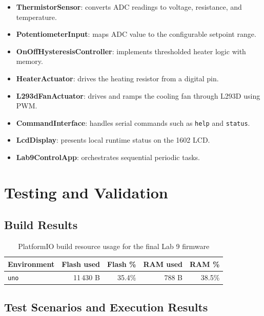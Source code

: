 \documentclass[12pt]{article}
\begin{document}
\begin{itemize}
    \item \textbf{ThermistorSensor}: converts ADC readings to voltage, resistance, and temperature.
    \item \textbf{PotentiometerInput}: maps ADC value to the configurable setpoint range.
    \item \textbf{OnOffHysteresisController}: implements thresholded heater logic with memory.
    \item \textbf{HeaterActuator}: drives the heating resistor from a digital pin.
    \item \textbf{L293dFanActuator}: drives and ramps the cooling fan through L293D using PWM.
    \item \textbf{CommandInterface}: handles serial commands such as \texttt{help} and \texttt{status}.
    \item \textbf{LcdDisplay}: presents local runtime status on the 1602 LCD.
    \item \textbf{Lab9ControlApp}: orchestrates sequential periodic tasks.
\end{itemize}

\section{Testing and Validation}

\subsection{Build Results}

\begin{table}[H]
\centering
\begin{tabular}{lrrrr}
\toprule
\textbf{Environment} & \textbf{Flash used} & \textbf{Flash \%} & \textbf{RAM used} & \textbf{RAM \%} \\
\midrule
\texttt{uno} & 11\,430 B & 35.4\% & 788 B & 38.5\% \\
\bottomrule
\end{tabular}
\caption{PlatformIO build resource usage for the final Lab 9 firmware}
\label{tab:build}
\end{table}

\subsection{Test Scenarios and Execution Results}
\end{document}
